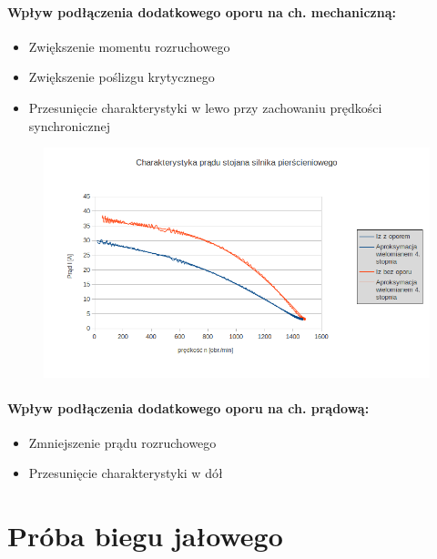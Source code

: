 \documentclass[12pt]{article}
\newcommand{\ZMa}{17}
\begin{document}
\paragraph{Wpływ podłączenia dodatkowego oporu na ch. mechaniczną:}
\begin{itemize}
	\item Zwiększenie momentu rozruchowego
	\item Zwiększenie poślizgu krytycznego
	\item Przesunięcie charakterystyki w lewo przy zachowaniu prędkości synchronicznej
\end{itemize}
	\begin{figure}[H]
	\centering
	\includegraphics[width=\ZMa cm]{ch_pradowa_pierscieniowy}
	\end{figure}
\paragraph{Wpływ podłączenia dodatkowego oporu na ch. prądową:}
	\begin{itemize}
	\item Zmniejszenie prądu rozruchowego
	\item Przesunięcie charakterystyki w dół
\end{itemize}

\section{Próba biegu jałowego}
\end{document}
